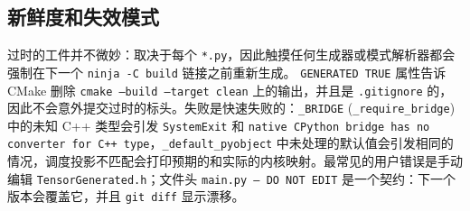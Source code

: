 \subsection{新鲜度和失效模式}

过时的工件并不微妙：取决于每个 \texttt{*.py}，因此触摸任何生成器或模式解析器都会强制在下一个 \texttt{ninja -C build} 链接之前重新生成。 \texttt{GENERATED TRUE} 属性告诉 CMake 删除 \texttt{cmake --build --target clean} 上的输出，并且是 \texttt{.gitignore} 的，因此不会意外提交过时的标头。失败是快速失败的：\texttt{\_BRIDGE} (\texttt{\_require\_bridge}) 中的未知 C++ 类型会引发 \texttt{SystemExit} 和 \texttt{native CPython bridge has no converter for C++ type}，\texttt{\_default\_pyobject} 中未处理的默认值会引发相同的情况，调度投影不匹配会打印预期的和实际的内核映射。最常见的用户错误是手动编辑 \texttt{TensorGenerated.h}；文件头 \texttt{main.py -- DO NOT EDIT} 是一个契约：下一个版本会覆盖它，并且 \texttt{git diff} 显示漂移。


